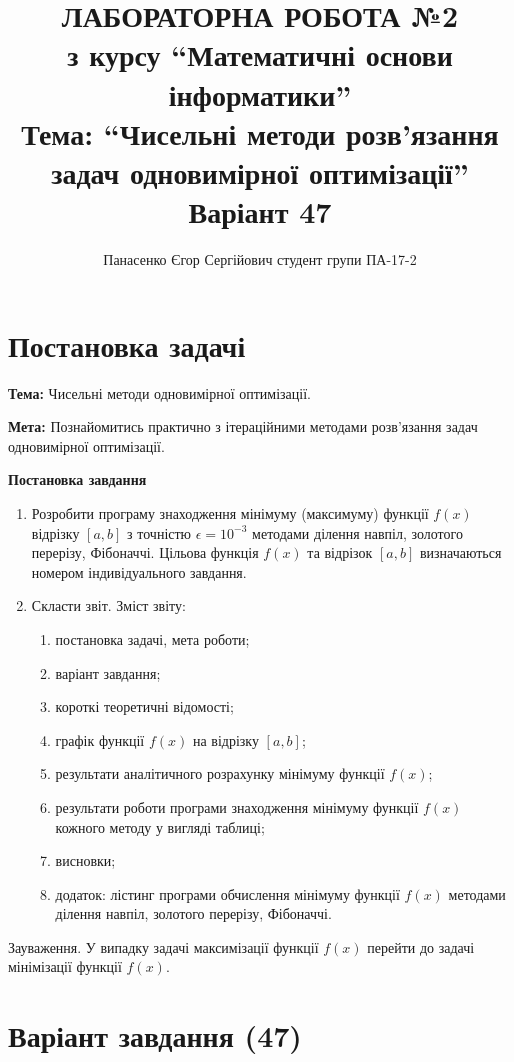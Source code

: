 \documentclass[14pt,a4paper]{extarticle}
\title{%
  \MakeUppercase{\textbf{Лабораторна робота №2}}\\
  \large з курсу ``Математичні основи інформатики''\\
  Тема: ``Чисельні методи розв'язання задач одновимірної оптимізації''\\
  Варіант 47}
\author{Панасенко Єгор Сергійович \newline студент групи ПА-17-2}
\date{}
\theoremstyle{definition}
\begin{document}
\sloppy %
\allowdisplaybreaks %

\maketitle
\thispagestyle{empty}

\section{Постановка задачі}

\textbf{Тема:} Чисельні методи одновимірної оптимізації.

\textbf{Мета:} Познайомитись практично з ітераційними методами розв'язання задач
одновимірної оптимізації.

\textbf{Постановка завдання}
\begin{enumerate}
\item Розробити програму знаходження мінімуму (максимуму) функції $f(x)$ відрізку
$[a,b]$ з точністю $\epsilon=10^{-3}$ методами ділення навпіл, золотого перерізу, Фібоначчі.
Цільова функція $f(x)$ та відрізок $[a, b]$ визначаються номером індивідуального завдання.

\item Скласти звіт. Зміст звіту:
\begin{enumerate}
\item постановка задачі, мета роботи;
\item варіант завдання;
\item короткі теоретичні відомості;
\item графік функції $f(x)$ на відрізку $[a,b]$;
\item результати аналітичного розрахунку мінімуму функції $f(x)$;
\item результати роботи програми знаходження мінімуму функції $f(x)$ кожного методу у вигляді таблиці;
\item висновки;
\item додаток: лістинг програми обчислення мінімуму функції $f(x)$ методами ділення навпіл, золотого перерізу, Фібоначчі.
\end{enumerate}
\end{enumerate}
Зауваження. У випадку задачі максимізації функції $f(x)$ перейти до задачі мінімізації функції $f(x)$.

\section{Варіант завдання (47)}
\end{document}
